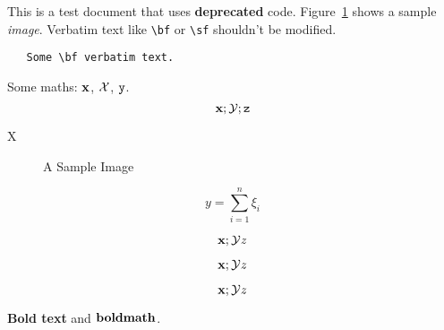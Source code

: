 \documentclass[12pt,a4paper]{article}
\newcommand{\boldstuff}[1]{{\bf #1}}
\begin{document}
This is a test {\sf document} that uses {\bf deprecated} code.
Figure~\ref{fig:sample} shows a sample {\it image}.
  Verbatim text like \verb|\bf| or \verb|\sf| shouldn't be
modified. 
\begin{verbatim}
   Some \bf verbatim text.
\end{verbatim}

Some maths: $\bf x$, \begin{math}\cal X\end{math},
\(\tt y\).
\[
  {\bf x}; {\cal Y}; {\tt z}
\]

   \centerline{X}

\begin{figure}
\centerline{}
\caption{A Sample Image}
\label{fig:sample}
\end{figure}

$$y = \sum_{i=1}^n \xi_i$$

$${\bf x}; {\cal Y} {\it z}$$

\begin{displaymath}
{\bf x}; {\cal Y} {\it z}
\end{displaymath}

\begin{equation}
{\bf x}; {\cal Y} {\it z}
\end{equation}

\boldstuff{Bold text} and $\boldstuff{bold math}$.
\end{document}
